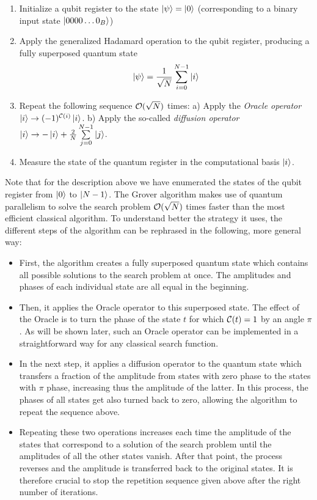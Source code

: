 \begin{enumerate}
 \item Initialize a qubit register to the state $\left| \psi \right> = \left| 0 \right>$ (corresponding to a binary input state $\left| 0000\hdots0_B \right>$)
 \item Apply the generalized Hadamard operation to the qubit register, producing a fully superposed quantum state $$\left| \psi \right> = \frac{1}{\sqrt{N}}\sum\limits_{i=0}^{N-1} \left| i \right>$$
 \item Repeat the following sequence $\begin{mathcal}O\end{mathcal}(\sqrt{N})$ times:
 \subitem a) Apply the {\it Oracle operator} $\ket{i}\to (-1)^{\Or(i)}\ket{i}$.
 \subitem b) Apply the so-called {\it diffusion operator} $\left| i \right> \to -\left| i \right>+\frac{2}{N}\sum\limits_{j=0}^{N-1}\left| j \right>$.
	\item Measure the state of the quantum register in the computational basis $\left| i \right>$.
\end{enumerate}

Note that for the description above we have enumerated the states of the qubit register from $\left| 0 \right>$ to $\left| N-1 \right>$. The Grover algorithm makes use of quantum parallelism to solve the search problem $\begin{mathcal}O\end{mathcal}(\sqrt{N})$ times faster than the most efficient classical algorithm. To understand better the strategy it uses, the different steps of the algorithm can be rephrased in the following, more general way:

\begin{itemize}
\item First, the algorithm creates a fully superposed quantum state which contains all possible solutions to the search problem at once. The amplitudes and phases of each individual state are all equal in the beginning.
\item Then, it applies the Oracle operator to this superposed state. The effect of the Oracle is to turn the phase of the state $t$ for which $\Or(t)=1$ by an angle $\pi$. As will be shown later, such an Oracle operator can be implemented in a straightforward way for any classical search function.
\item In the next step, it applies a diffusion operator to the quantum state which transfers a fraction of the amplitude from states with zero phase to the states with $\pi$ phase, increasing thus the amplitude of the latter. In this process, the phases of all states get also turned back to zero, allowing the algorithm to repeat the sequence above.
\item Repeating these two operations increases each time the amplitude of the states that correspond to a solution of the search problem until the amplitudes of all the other states vanish. After that point, the process reverses and the amplitude is transferred back to the original states. It is therefore crucial to stop the repetition sequence given above after the right number of iterations.
\end{itemize}

